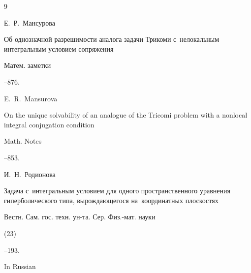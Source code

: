 \begin{thebibliography}{9}

\by Е.~Р.~Мансурова

\paper Об однозначной разрешимости аналога задачи Трикоми с~нелокальным интегральным условием сопряжения

\jour Матем. заметки




--876.




\transl

\by E.~R.~Mansurova

\paper On the unique solvability of an analogue of the Tricomi problem with a nonlocal integral conjugation condition

\jour Math. Notes




--853.











%


\by И.~Н.~Родионова

\paper Задача с~интегральным условием для одного пространственного уравнения гиперболического типа, вырождающегося на~координатных плоскостях

\jour Вестн. Сам. гос. техн. ун-та. Сер. Физ.-мат. науки


(23)

--193.



\misctransl

\lang In Russian


\end{thebibliography}
